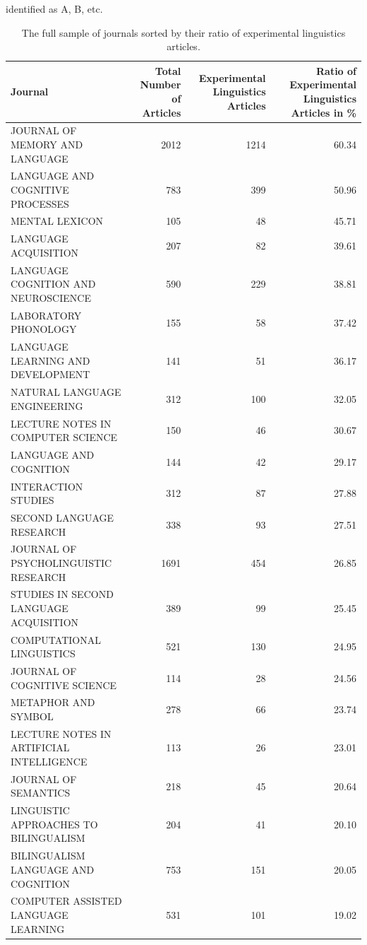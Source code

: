 \documentclass[]{elsarticle} %
\begin{document}
identified as A, B, etc.

\begin{table}

\caption{\label{tab:journals_sample}The full sample of journals sorted by their ratio of experimental linguistics articles.}
\centering
\begin{tabular}[t]{l|r|r|r}
\hline
Journal & Total Number of Articles & Experimental Linguistics Articles & Ratio of Experimental Linguistics Articles in \%\\
\hline
JOURNAL OF MEMORY AND LANGUAGE & 2012 & 1214 & 60.34\\
\hline
LANGUAGE AND COGNITIVE PROCESSES & 783 & 399 & 50.96\\
\hline
MENTAL LEXICON & 105 & 48 & 45.71\\
\hline
LANGUAGE ACQUISITION & 207 & 82 & 39.61\\
\hline
LANGUAGE COGNITION AND NEUROSCIENCE & 590 & 229 & 38.81\\
\hline
LABORATORY PHONOLOGY & 155 & 58 & 37.42\\
\hline
LANGUAGE LEARNING AND DEVELOPMENT & 141 & 51 & 36.17\\
\hline
NATURAL LANGUAGE ENGINEERING & 312 & 100 & 32.05\\
\hline
LECTURE NOTES IN COMPUTER SCIENCE & 150 & 46 & 30.67\\
\hline
LANGUAGE AND COGNITION & 144 & 42 & 29.17\\
\hline
INTERACTION STUDIES & 312 & 87 & 27.88\\
\hline
SECOND LANGUAGE RESEARCH & 338 & 93 & 27.51\\
\hline
JOURNAL OF PSYCHOLINGUISTIC RESEARCH & 1691 & 454 & 26.85\\
\hline
STUDIES IN SECOND LANGUAGE ACQUISITION & 389 & 99 & 25.45\\
\hline
COMPUTATIONAL LINGUISTICS & 521 & 130 & 24.95\\
\hline
JOURNAL OF COGNITIVE SCIENCE & 114 & 28 & 24.56\\
\hline
METAPHOR AND SYMBOL & 278 & 66 & 23.74\\
\hline
LECTURE NOTES IN ARTIFICIAL INTELLIGENCE & 113 & 26 & 23.01\\
\hline
JOURNAL OF SEMANTICS & 218 & 45 & 20.64\\
\hline
LINGUISTIC APPROACHES TO BILINGUALISM & 204 & 41 & 20.10\\
\hline
BILINGUALISM LANGUAGE AND COGNITION & 753 & 151 & 20.05\\
\hline
COMPUTER ASSISTED LANGUAGE LEARNING & 531 & 101 & 19.02\\

\end{tabular}
\end{table}
\end{document}
